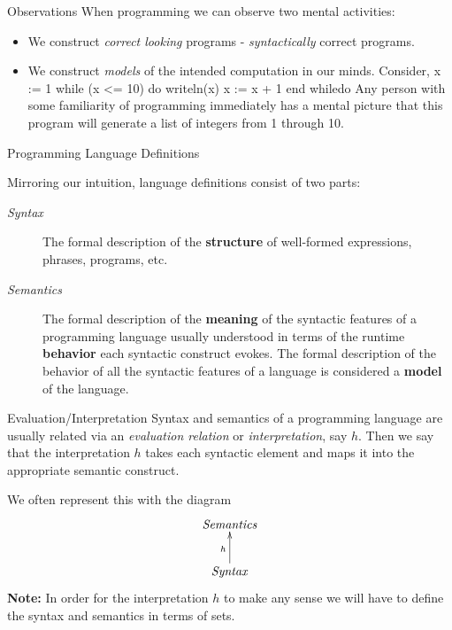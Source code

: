 \documentclass{beamer}
\begin{document}
\begin{frame}[fragile]{Observations}
When programming we can observe two mental activities:
\begin{itemize}
\item We construct {\em correct looking} programs - {\em syntactically} correct programs.
\item We construct {\em models} of the intended computation in our minds. Consider,
\bcode
x := 1
while (x <= 10) do
     writeln(x)
     x := x + 1
end whiledo
\ecode
Any person with some familiarity of programming immediately has a mental picture that this program
will generate a list of integers from 1 through 10.
\end{itemize}

\end{frame}

\begin{frame}{Programming Language Definitions}

Mirroring our intuition, language definitions consist of two parts:

\begin{description}
\item[\em Syntax] The formal description of the 
{\bf structure} of  well-formed expressions, phrases, programs, etc. 
\item[\em Semantics] The formal description of the {\bf  meaning} of the syntactic features of a programming language
usually understood in terms of the runtime {\bf behavior} each syntactic construct evokes.  The formal description of the behavior of all
the syntactic features of a language is considered a {\bf model} of the language.
\end{description}
\end{frame}

\begin{frame}{Evaluation/Interpretation}
Syntax and semantics of a programming language are usually related via an {\em evaluation relation}
or {\em interpretation}, say $h$.  Then we say that the interpretation $h$ takes each syntactic element and
maps it into the appropriate semantic construct.

\vspace{.1in}

We often represent this with the diagram
\[
\xymatrix{
\mathit{Semantics}\\
\mathit{Syntax}\ar[u]^h
}
\]
{\bf Note:} In order for the interpretation $h$ to make any sense we will have to define the syntax and
semantics in terms of sets.

\end{frame}
\end{document}

